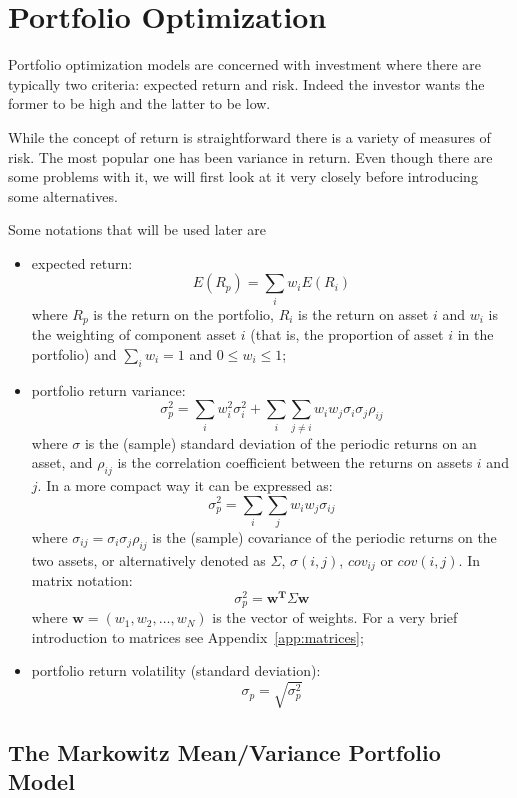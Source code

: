 \chapter{Portfolio Optimization}\label{portfolio-optimization}

Portfolio optimization models are concerned with investment where there
are typically two criteria: expected return and risk.
Indeed the investor wants the former to be high and the latter to be low. 

While the concept of return is straightforward there is a variety of measures of risk. 
The most popular one has been variance in return. 
Even though there are some problems with it, we will first look
at it very closely before introducing some alternatives.

Some notations that will be used later are

\begin{itemize}
\tightlist
\item
  expected return: \[ E(R_{p}) = \sum _{i}w_{i} E(R_{i}) \] where
  \(R_{p}\) is the return on the portfolio, \(R_{i}\) is the return on
  asset \(i\) and \(w_{i}\) is the weighting of component asset \(i\)
  (that is, the proportion of asset \(i\) in the portfolio) and
  \(\sum_{i}w_i = 1\) and \(0 \le w_i \le 1\);
\item
  portfolio return variance:
  \[ \sigma _{p}^{2} = \sum _{i}w_{i}^{2}\sigma _{i}^{2} + \sum _{i}\sum _{j\neq i}w_{i}w_{j}\sigma _{i}\sigma _{j}\rho _{ij} \]
  where \(\sigma\) is the (sample) standard deviation of the periodic
  returns on an asset, and \(\rho _{ij}\) is the correlation coefficient
  between the returns on assets \(i\) and \(j\). In a more compact way
  it can be expressed as:
  \[ \sigma _{p}^{2}=\sum _{i}\sum _{j}w_{i}w_{j}\sigma _{ij} \] where
  \(\sigma _{ij}=\sigma _{i}\sigma _{j}\rho _{ij}\) is the (sample)
  covariance of the periodic returns on the two assets, or alternatively
  denoted as \(\Sigma\), \(\sigma (i,j)\), \(cov_{ij}\) or \(cov(i,j)\).
  In matrix notation:
  \[\sigma_p^2 = \mathbf{w^T}\Sigma\mathbf{w} \]
  where $\mathbf{w} = (w_1,w_2,\ldots,w_N)$ is the vector of weights. For a very brief introduction to matrices see Appendix~\ref{app:matrices};
\item
  portfolio return volatility (standard deviation):
  \[ \sigma _{p}= \sqrt{\sigma _{p}^{2}}\]
\end{itemize}

\section{The Markowitz Mean/Variance Portfolio Model}
\label{the-markowitz-meanvariance-portfolio-model}

